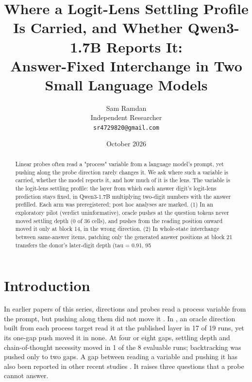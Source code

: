 \documentclass[11pt]{article}
\title{Where a Logit-Lens Settling Profile Is Carried, and Whether Qwen3-1.7B Reports It:\\ Answer-Fixed Interchange in Two Small Language Models}
\author{
  Sam Ramdan\\
  Independent Researcher\\
  \texttt{sr4729820@gmail.com}
}
\date{October 2026}
\begin{document}
\maketitle

\begin{abstract}
Linear probes often read a "process" variable from a language model's prompt, yet pushing along the probe direction rarely changes it. We ask where such a variable is carried, whether the model reports it, and how much of it is the lens. The variable is the logit-lens settling profile: the layer from which each answer digit's logit-lens prediction stays fixed, in Qwen3-1.7B multiplying two-digit numbers with the answer prefilled. Each arm was preregistered; post hoc analyses are marked. (1) In an exploratory pilot (verdict uninformative), oracle pushes at the question tokens never moved settling depth (0 of 36 cells), and pushes from the reading position onward moved it only at block 14, in the wrong direction. (2) In whole-state interchange between same-answer items, patching only the generated answer positions at block 21 transfers the donor's later-digit depth (tau = 0.91, 95%
\end{abstract}

\section{Introduction}

In earlier papers of this series, directions and probes read a process variable from the prompt, but pushing along them did not move it \citep{ramdan2026crv2,ramdan2026battery}. In \citet{ramdan2026battery}, an oracle direction built from each process target read it at the published layer in 17 of 19 runs, yet its one-gap push moved it in none. At four or eight gaps, settling depth and chain-of-thought necessity moved in 1 of the 8 evaluable runs; backtracking was pushed only to two gaps. A gap between reading a variable and pushing it has also been reported in other recent studies \citep{xun2026lagged,galeone2026perfect}. It raises three questions that a probe cannot answer.
\end{document}
